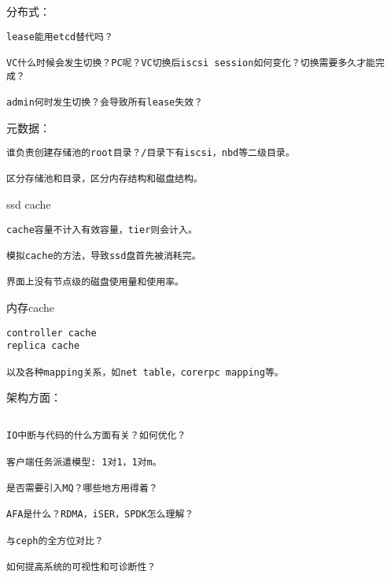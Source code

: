 分布式：
\begin{lstlisting}
lease能用etcd替代吗？

VC什么时候会发生切换？PC呢？VC切换后iscsi session如何变化？切换需要多久才能完成？

admin何时发生切换？会导致所有lease失效？
\end{lstlisting}

元数据：
\begin{lstlisting}
谁负责创建存储池的root目录？/目录下有iscsi，nbd等二级目录。

区分存储池和目录，区分内存结构和磁盘结构。
\end{lstlisting}

ssd cache
\begin{lstlisting}
cache容量不计入有效容量，tier则会计入。

模拟cache的方法，导致ssd盘首先被消耗完。

界面上没有节点级的磁盘使用量和使用率。
\end{lstlisting}

内存cache
\begin{lstlisting}
controller cache
replica cache

以及各种mapping关系，如net table，corerpc mapping等。
\end{lstlisting}

架构方面：
\begin{lstlisting}

IO中断与代码的什么方面有关？如何优化？

客户端任务派遣模型: 1对1，1对m。

是否需要引入MQ？哪些地方用得着？

AFA是什么？RDMA，iSER，SPDK怎么理解？

与ceph的全方位对比？

如何提高系统的可视性和可诊断性？
\end{lstlisting}
